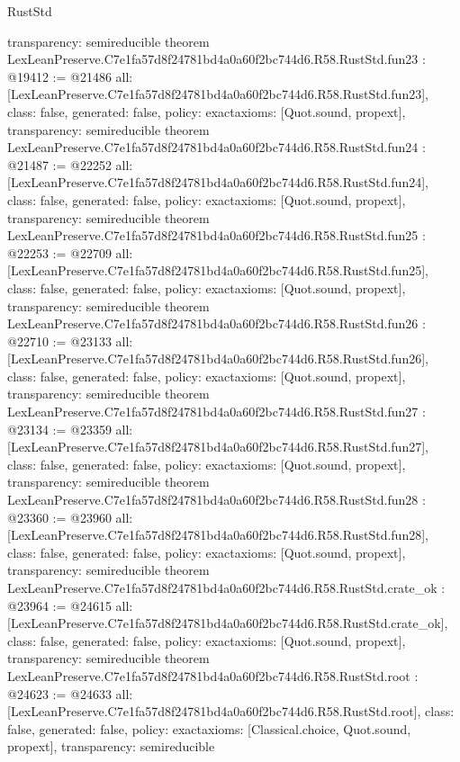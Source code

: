 \begin{lexlean}{RustStd}
\begin{coremodule}
{  transparency: semireducible
}
theorem LexLeanPreserve.C7e1fa57d8f24781bd4a0a60f2bc744d6.R58.RustStd.fun23 : @19412 := @21486 {
  all: [LexLeanPreserve.C7e1fa57d8f24781bd4a0a60f2bc744d6.R58.RustStd.fun23],
  class: false,
  generated: false,
  policy: exact{axioms: [Quot.sound, propext]},
  transparency: semireducible
}
theorem LexLeanPreserve.C7e1fa57d8f24781bd4a0a60f2bc744d6.R58.RustStd.fun24 : @21487 := @22252 {
  all: [LexLeanPreserve.C7e1fa57d8f24781bd4a0a60f2bc744d6.R58.RustStd.fun24],
  class: false,
  generated: false,
  policy: exact{axioms: [Quot.sound, propext]},
  transparency: semireducible
}
theorem LexLeanPreserve.C7e1fa57d8f24781bd4a0a60f2bc744d6.R58.RustStd.fun25 : @22253 := @22709 {
  all: [LexLeanPreserve.C7e1fa57d8f24781bd4a0a60f2bc744d6.R58.RustStd.fun25],
  class: false,
  generated: false,
  policy: exact{axioms: [Quot.sound, propext]},
  transparency: semireducible
}
theorem LexLeanPreserve.C7e1fa57d8f24781bd4a0a60f2bc744d6.R58.RustStd.fun26 : @22710 := @23133 {
  all: [LexLeanPreserve.C7e1fa57d8f24781bd4a0a60f2bc744d6.R58.RustStd.fun26],
  class: false,
  generated: false,
  policy: exact{axioms: [Quot.sound, propext]},
  transparency: semireducible
}
theorem LexLeanPreserve.C7e1fa57d8f24781bd4a0a60f2bc744d6.R58.RustStd.fun27 : @23134 := @23359 {
  all: [LexLeanPreserve.C7e1fa57d8f24781bd4a0a60f2bc744d6.R58.RustStd.fun27],
  class: false,
  generated: false,
  policy: exact{axioms: [Quot.sound, propext]},
  transparency: semireducible
}
theorem LexLeanPreserve.C7e1fa57d8f24781bd4a0a60f2bc744d6.R58.RustStd.fun28 : @23360 := @23960 {
  all: [LexLeanPreserve.C7e1fa57d8f24781bd4a0a60f2bc744d6.R58.RustStd.fun28],
  class: false,
  generated: false,
  policy: exact{axioms: [Quot.sound, propext]},
  transparency: semireducible
}
theorem LexLeanPreserve.C7e1fa57d8f24781bd4a0a60f2bc744d6.R58.RustStd.crate_ok : @23964 := @24615 {
  all: [LexLeanPreserve.C7e1fa57d8f24781bd4a0a60f2bc744d6.R58.RustStd.crate_ok],
  class: false,
  generated: false,
  policy: exact{axioms: [Quot.sound, propext]},
  transparency: semireducible
}
theorem LexLeanPreserve.C7e1fa57d8f24781bd4a0a60f2bc744d6.R58.RustStd.root : @24623 := @24633 {
  all: [LexLeanPreserve.C7e1fa57d8f24781bd4a0a60f2bc744d6.R58.RustStd.root],
  class: false,
  generated: false,
  policy: exact{axioms: [Classical.choice, Quot.sound, propext]},
  transparency: semireducible
}


\end{coremodule}
\end{lexlean}
